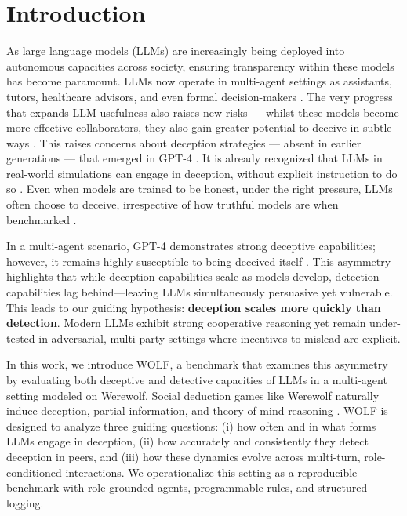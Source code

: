 \documentclass{article}
\begin{document}
\section{Introduction}
As large language models (LLMs) are increasingly being deployed into autonomous capacities across society, ensuring transparency within these models has become paramount. LLMs now operate in multi-agent settings as assistants, tutors, healthcare advisors, and even formal decision-makers \cite{haase2025staticresponsesmultiagentllm}. The very progress that expands LLM usefulness also raises new risks --- whilst these models become more effective collaborators, they also gain greater potential to deceive in subtle ways \cite{kwa2025measuringaiabilitycomplete}. This raises concerns about deception strategies --- absent in earlier generations --- that emerged in GPT-4 \cite{Hagendorff_2024}. It is already recognized that LLMs in real-world simulations can engage in deception, without explicit instruction to do so \cite{scheurer2024largelanguagemodelsstrategically}. Even when models are trained to be honest, under the right pressure, LLMs often choose to deceive, irrespective of how truthful models are when benchmarked \cite{ren2025maskbenchmarkdisentanglinghonesty}.

In a multi-agent scenario, GPT-4 demonstrates strong deceptive capabilities; however, it remains highly susceptible to being deceived itself \cite{curvo2025traitorsdeceptiontrustmultiagent}. This asymmetry highlights that while deception capabilities scale as models develop, detection capabilities lag behind—leaving LLMs simultaneously persuasive yet vulnerable. This leads to our guiding hypothesis: \textbf{deception scales more quickly than detection}. Modern LLMs exhibit strong cooperative reasoning yet remain under-tested in adversarial, multi-party settings where incentives to mislead are explicit.

In this work, we introduce WOLF, a benchmark that examines this asymmetry by evaluating both deceptive and detective capacities of LLMs in a multi-agent setting modeled on Werewolf. Social deduction games like Werewolf naturally induce deception, partial information, and theory-of-mind reasoning \cite{bailis2024werewolfarenacasestudy}. WOLF is designed to analyze three guiding questions: (i) how often and in what forms LLMs engage in deception, (ii) how accurately and consistently they detect deception in peers, and (iii) how these dynamics evolve across multi-turn, role-conditioned interactions. We operationalize this setting as a reproducible benchmark with role-grounded agents, programmable rules, and structured logging. 
\end{document}

